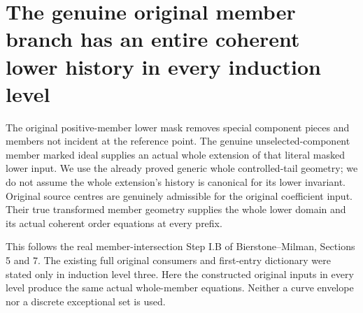 \section{The genuine original member branch has an entire coherent lower history in every induction level}

The original positive-member lower mask removes special component pieces and
members not incident at the reference point. The genuine unselected-component
member marked ideal supplies an actual whole extension of that literal masked
lower input. We use the already proved generic whole controlled-tail geometry;
we do not assume the whole extension's history is canonical for its lower
invariant. Original source centres are genuinely admissible for the original
coefficient input. Their true transformed member geometry supplies the whole
lower domain and its actual coherent order equations at every prefix.

This follows the real member-intersection Step I.B of
Bierstone--Milman\cite{bierstone-milman08-functoriality}, Sections 5 and 7.
The existing full original consumers and first-entry dictionary were stated
only in induction level three. Here the constructed original inputs in every
level produce the same actual whole-member equations. Neither a curve
envelope nor a discrete exceptional set is used.


